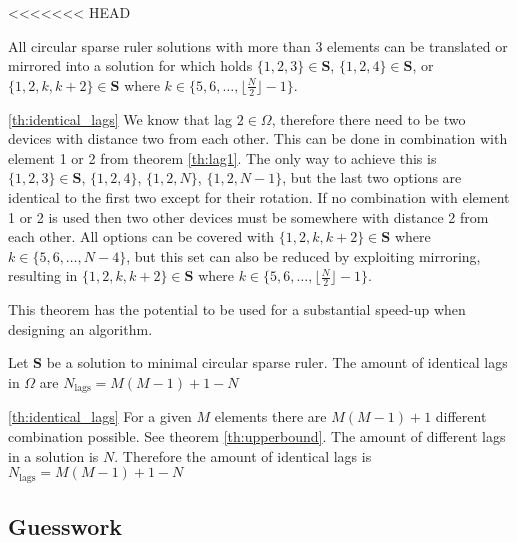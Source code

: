 \documentclass[a4paper, openany, oneside]{memoir}
\begin{document}
<<<<<<< HEAD

\begin{blockTheorem} \label{th:lag2}\nolinebreak
    All circular sparse ruler solutions with more than 3 elements can be translated or mirrored into a solution for which holds $\{1,2,3\} \in \mathbf{S}$, $\{1,2,4\} \in \mathbf{S}$,  or $\{1,2,k, k+2\} \in \mathbf{S}$ where $k \in \{5,6,\dots,\lfloor\frac{N}{2}\rfloor-1\}$.   \nolinebreak
\end{blockTheorem}

\begin{blockProofTheorem}{\ref{th:identical_lags}}
    We know that lag $2 \in \Omega$, therefore there need to be two devices with distance two from each other. This can be done in combination with element 1 or 2 from theorem \ref{th:lag1}. The only way to achieve this is $\{1,2,3\} \in \mathbf{S}$, $\{1,2,4\}$, $\{1,2,N\}$, $\{1,2,N-1\}$, but the last two options are identical to the first two except for their rotation. If no combination with element 1 or 2 is used then two other devices must be somewhere with distance 2 from each other. All options can be covered with $\{1,2,k, k+2\} \in \mathbf{S}$ where $k \in \{5,6,\dots,N-4\}$, but this set can also be reduced by exploiting mirroring, resulting in $\{1,2,k, k+2\} \in \mathbf{S}$ where $k \in \{5,6,\dots,\lfloor\frac{N}{2}\rfloor-1\}$. 
\end{blockProofTheorem}

This theorem has the potential to be used for a substantial speed-up when designing an algorithm.

\begin{blockTheorem} \label{th:identical_lags}\nolinebreak
    Let $\mathbf{S}$ be a solution to minimal circular sparse ruler. The amount of identical lags in $\Omega$ are $N_{\text{lags}} = M(M-1)+1-N$   \nolinebreak
\end{blockTheorem}

\begin{blockProofTheorem}{\ref{th:identical_lags}}
    For a given $M$ elements there are $M(M-1)+1$ different combination possible. See theorem \ref{th:upperbound}. The amount of different lags in a solution is $N$. Therefore the amount of identical lags is $N_{\text{lags}} = M(M-1)+1-N$ 
\end{blockProofTheorem}

\subsection{Guesswork}
\end{document}
